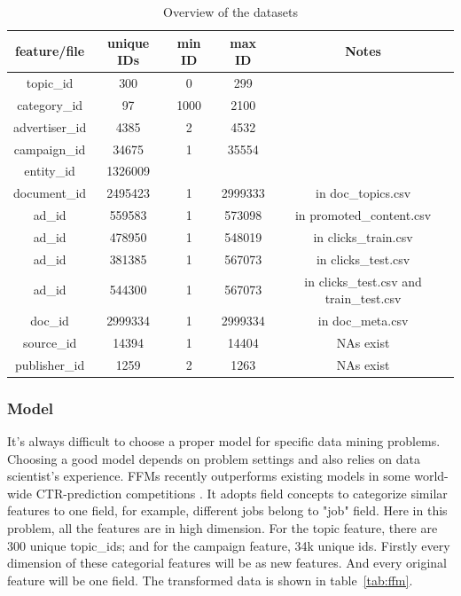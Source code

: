 \documentclass[fleqn,10pt]{SelfArx} %
\begin{document}
\begin{table}[!htbp]
\begin{center}
  \begin{tabular}{ ccccc }
    \hline
    feature/file          & unique IDs & min ID & max ID & Notes \\ \hline\hline
    topic\_id         &      300       &    0       &   299    &    \\
    category\_id   &      97         &   1000  &   2100  &    \\
    advertiser\_id &      4385     &   2        &   4532  &    \\
    campaign\_id &      34675   &   1        &  35554 &     \\
    entity\_id        &   1326009  &             &             &    \\
    document\_id &   2495423  &   1        & 2999333 & in doc\_topics.csv\\
    ad\_id             &    559583   &   1        & 573098   & in promoted\_content.csv\\
    ad\_id             &   478950    &   1        & 548019  & in clicks\_train.csv \\
    ad\_id            &   381385    &   1        & 567073  & in clicks\_test.csv  \\
    ad\_id            &     544300   &   1       &   567073 & in clicks\_test.csv and train\_test.csv \\
   doc\_id           &       2999334 &   1      &   2999334 & in doc\_meta.csv \\
   source\_id      &     14394     & 1         &  14404     &  NAs exist \\
   publisher\_id   &       1259     &  2       &   1263      &  NAs exist \\
    \hline\hline
  \end{tabular}
\end{center}
\caption{Overview of the datasets}\label{tab:overview}
\end{table}

\subsubsection{Model}
It's always difficult to choose a proper model for specific data mining problems. Choosing a good model depends on problem settings and also relies on data scientist's experience. FFMs recently outperforms existing models in some world-wide CTR-prediction competitions \cite{juan2016field}. It adopts field concepts to categorize similar features to one field, for example, different jobs belong to "job" field. Here in this problem, all the features are in high dimension. For the topic feature, there are 300 unique topic\_ids; and for the campaign feature, 34k unique ids. Firstly every dimension of these categorial features will be as new features. And every original feature will be one field. The transformed data is shown in table~\ref{tab:ffm}. 
\end{document}
